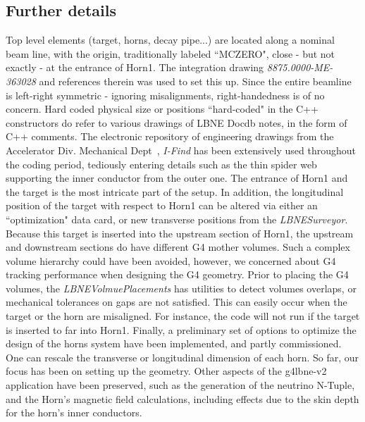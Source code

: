 \subsection{Further details}   Top level elements (target, horns, decay pipe...) are located along a nominal beam line, with the origin, traditionally labeled ``MCZERO", close - but not   exactly - at the entrance of Horn1. The integration drawing {\em 8875.0000-ME-363028} and references therein was used to set this up. Since the entire   beamline is left-right symmetric - ignoring misalignments, right-handedness is of no concern.      Hard coded physical size or positions ``hard-coded" in the C++ constructors do refer to various drawings of LBNE Docdb notes, in the form of C++ comments. The   electronic repository of engineering drawings from  the Accelerator Div. Mechanical Dept~\cite{IFIND}, {\em I-Find} has been extensively used throughout the   coding period, tediously entering details such as the thin spider web supporting the inner conductor from the outer one.        The entrance of Horn1 and the target is the most intricate part of the setup. In addition, the longitudinal position of the target with respect to Horn1 can be   altered via either an ``optimization" data card, or new transverse positions from the {\em LBNESurveyor}.  Because this target is inserted into the upstream section of   Horn1, the upstream and downstream sections do have different G4 mother volumes.  Such a complex volume hierarchy could have been avoided, however, we concerned   about G4 tracking performance when designing the G4 geometry.       Prior to placing the G4 volumes, the {\em LBNEVolmuePlacements} has utilities to detect volumes overlaps, or mechanical tolerances on gaps are not satisfied.    This can easily occur when the target or the horn are misaligned. For instance, the code will not run if the target is inserted to far into Horn1.      Finally, a preliminary set of options to optimize the design of the horns system have been implemented, and partly commissioned. One can rescale the transverse   or longitudinal dimension of each horn.       So far, our focus has been on setting up the geometry. Other aspects of the g4lbne-v2 application have been preserved, such as the generation of the neutrino   N-Tuple, and the Horn's magnetic field calculations, including effects due to the skin depth for the horn's inner conductors.      


